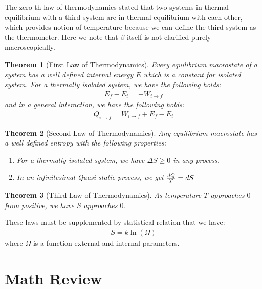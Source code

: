 \documentclass[11pt,oneside]{book}
\theoremstyle{break}
\theoremstyle{break}
\newtheorem{thm}{Theorem}[section]
\newcommand{\dbar}{d\hspace*{-0.08em}\bar{}\hspace*{0.1em}}
\begin{document}
The zero-th law of thermodynamics stated that two systems in thermal equilibrium with a third system are in thermal equilibrium with each other, which provides notion of temperature because we can define the third system as the thermometer. Here we note that $\beta$ itself is not clarified purely macroscopically.\\


\begin{thm}[First Law of Thermodynamics]
Every equilibrium macrostate of a system has a well defined internal energy $\bar{E}$ which is a constant for isolated system. For a thermally isolated system, we have the following holds:
\begin{align*}
E_f - E_i = -W_{i \to f}
\end{align*}
and in a general interaction, we have the following holds:
\begin{align*}
Q_{i\to f} = W_{i\to f} + E_f -E_i
\end{align*}
\end{thm}

\begin{thm}[Second Law of Thermodynamics]
Any equilibrium macrostate has a well defined entropy with the following properties:
\begin{enumerate}
\item For a thermally isolated system, we have $\Delta S \geq 0$ in any process.
\item In an infinitesimal Quasi-static process, we get $\frac{\dbar Q}{T} = dS$
\end{enumerate}
\end{thm}

\begin{thm}[Third Law of Thermodynamics]
As temperature $T$ approaches $0$ from positive, we have $S$ approaches $0$. 
\end{thm}

These laws must be supplemented by statistical relation that we have:
\begin{align*}
S = k\ln(\Omega)
\end{align*}
where $\Omega$ is a function external and internal parameters. 

\newpage
\section[Math Review]{\color{red}Math Review\color{black}}
\end{document}
